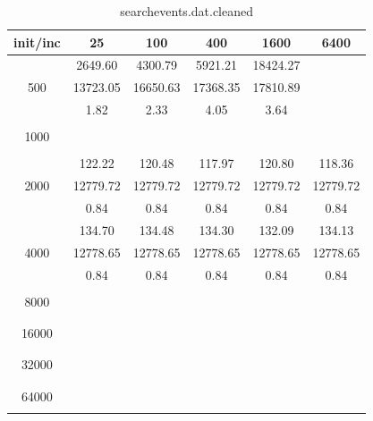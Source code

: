 {\begin{table}[th]
\caption{searchevents.dat.cleaned}
\label{tab:searchevents.dat.cleaned}
\centering
\begin{tabular}{|c||c|c|c|c|c|}
\hline
init/inc & 25 & 100 & 400 & 1600 & 6400 \\ \hline \hline
  & 2649.60 & 4300.79 & 5921.21 & 18424.27 & \\ 
500  & 13723.05 & 16650.63 & 17368.35 & 17810.89 & \\ 
  & 1.82 & 2.33 & 4.05 & 3.64 & \\ \hline 
  &  &  &  &  & \\ 
1000  &  &  &  &  & \\ 
  &  &  &  &  & \\ \hline 
  & 122.22 & 120.48 & 117.97 & 120.80 & 118.36\\ 
2000  & 12779.72 & 12779.72 & 12779.72 & 12779.72 & 12779.72\\ 
  & 0.84 & 0.84 & 0.84 & 0.84 & 0.84\\ \hline 
  & 134.70 & 134.48 & 134.30 & 132.09 & 134.13\\ 
4000  & 12778.65 & 12778.65 & 12778.65 & 12778.65 & 12778.65\\ 
  & 0.84 & 0.84 & 0.84 & 0.84 & 0.84\\ \hline 
  &  &  &  &  & \\ 
8000  &  &  &  &  & \\ 
  &  &  &  &  & \\ \hline 
  &  &  &  &  & \\ 
16000  &  &  &  &  & \\ 
  &  &  &  &  & \\ \hline 
  &  &  &  &  & \\ 
32000  &  &  &  &  & \\ 
  &  &  &  &  & \\ \hline 
  &  &  &  &  & \\ 
64000  &  &  &  &  & \\ 
  &  &  &  &  & \\ \hline 
\end{tabular}
\end{table}

}
